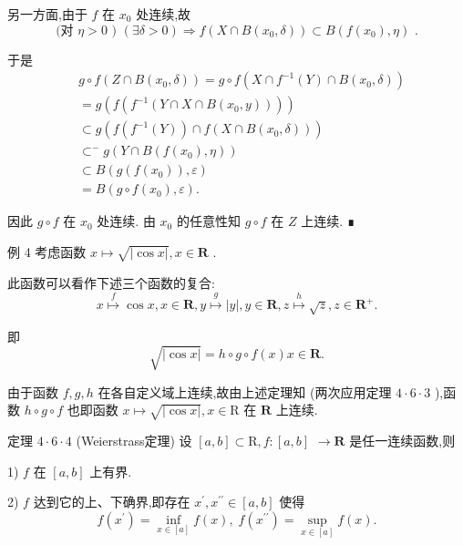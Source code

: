 另一方面,由于 $f$ 在 ${x}_{0}$ 处连续,故
$$\text{ (对 }\eta  > 0\text{ ) }\left( {\exists \delta  > 0}\right)  \Rightarrow  f\left( {X \cap  B\left( {{x}_{0},\delta }\right) }\right)  \subset  B\left( {f\left( {x}_{0}\right) ,\eta }\right) \text{ . }$$

于是
\begin{align*}
	&g \circ  f\left( {Z \cap  B\left( {{x}_{0},\delta }\right) }\right)  = g \circ  f\left( {X \cap  {f}^{-1}\left( Y\right)  \cap  B\left( {{x}_{0},\delta }\right) }\right)\\
	&= g\left( {f\left( {{f}^{-1}\left( {Y \cap  X \cap  B\left( {{x}_{0},y}\right) }\right) }\right) }\right)\\
	&\subset  g\left( {f\left( {{f}^{-1}\left( Y\right) }\right)  \cap  f\left( {X \cap  B\left( {{x}_{0},\delta }\right) }\right) }\right)\\
	&{ \subset  }^{ - }g\left( {Y \cap  B\left( {f\left( {x}_{0}\right) ,\eta }\right) }\right)\\
	&\subset  B\left( {g\left( {f\left( {x}_{0}\right) }\right) ,\varepsilon }\right)\\
	&= B\left( {g \circ  f\left( {x}_{0}\right) ,\varepsilon }\right) .
\end{align*}

因此 $g \circ  f$ 在 ${x}_{0}$ 处连续. 由 ${x}_{0}$ 的任意性知 $g \circ  f$ 在 $Z$ 上连续. ∎

例 4 考虑函数 $x \mapsto  \sqrt{\left| \cos x\right| },x \in  \mathbf{R}$ .

此函数可以看作下述三个函数的复合:
$$x\overset{f}{ \mapsto  }\cos x,x \in  \mathbf{R},y\overset{g}{ \mapsto  }\left| y\right| ,y \in  \mathbf{R},z\overset{h}{ \mapsto  }\sqrt{z},z \in  {\mathbf{R}}^{ + }.$$

即
$$\sqrt{\left| \cos x\right| } = h \circ  g \circ  f\left( x\right) x \in  \mathbf{R}.$$

由于函数 $f,g,h$ 在各自定义域上连续,故由上述定理知 (两次应用定理 $4 \cdot  6 \cdot  3$ ),函数 $h \circ  g \circ  f$ 也即函数 $x \mapsto  \sqrt{\left| \cos x\right| },x \in  \mathrm{R}$ 在 $\mathbf{R}$ 上连续.

定理 $4 \cdot  6 \cdot  4$ (Weierstrass定理) 设 $\left\lbrack  {a,b}\right\rbrack   \subset  \mathrm{R},f : \left\lbrack  {a,b}\right\rbrack$  $\rightarrow  \mathbf{R}$ 是任一连续函数,则

1) $f$ 在 $\left\lbrack  {a,b}\right\rbrack$ 上有界.

2) $f$ 达到它的上、下确界,即存在 ${x}^{\prime },{x}^{\prime \prime } \in  \left\lbrack  {a,b}\right\rbrack$ 使得
$$f\left( {x}^{\prime }\right)  = \mathop{\inf }\limits_{{x \in  \left\lbrack  a\right\rbrack  }}f\left( x\right) ,\;f\left( {x}^{\prime \prime }\right)  = \mathop{\sup }\limits_{{x \in  \left\lbrack  a\right\rbrack  }}f\left( x\right) .$$

